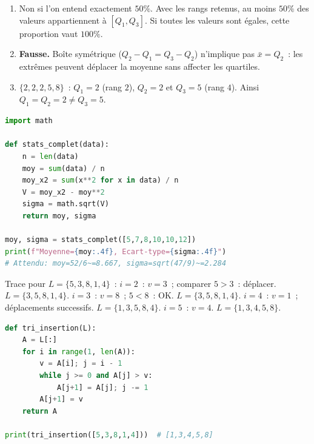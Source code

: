 
\begin{enumerate}
  \item Non si l'on entend exactement $50\%$. Avec les rangs retenus,
        au moins $50\%$ des valeurs appartiennent \`a $[Q_1,Q_3]$.
        Si toutes les valeurs sont \'egales, cette proportion vaut $100\%$.
  \item \textbf{Fausse.} Bo\^ite sym\'etrique ($Q_2-Q_1=Q_3-Q_2$) n'implique pas $\bar{x}=Q_2$~:
        les extr\^emes peuvent d\'eplacer la moyenne sans affecter les quartiles.
  \item $\{2,2,2,5,8\}$~: $Q_1=2$ (rang $2$), $Q_2=2$ et $Q_3=5$ (rang $4$).
        Ainsi $Q_1=Q_2=2\ne Q_3=5$.\checkmark
\end{enumerate}


\begin{lstlisting}[language=Python]
import math

def stats_complet(data):
    n = len(data)
    moy = sum(data) / n
    moy_x2 = sum(x**2 for x in data) / n
    V = moy_x2 - moy**2
    sigma = math.sqrt(V)
    return moy, sigma

moy, sigma = stats_complet([5,7,8,10,10,12])
print(f"Moyenne={moy:.4f}, Ecart-type={sigma:.4f}")
# Attendu: moy=52/6~=8.667, sigma=sqrt(47/9)~=2.284
\end{lstlisting}


Trace pour $L=\{5,3,8,1,4\}$~:
$i=2$~: $v=3$~; comparer $5>3$~: d\'eplacer. $L=\{3,5,8,1,4\}$.
$i=3$~: $v=8$~; $5<8$~: OK. $L=\{3,5,8,1,4\}$.
$i=4$~: $v=1$~; d\'eplacements successifs. $L=\{1,3,5,8,4\}$.
$i=5$~: $v=4$. $L=\{1,3,4,5,8\}$.\checkmark

\begin{lstlisting}[language=Python]
def tri_insertion(L):
    A = L[:]
    for i in range(1, len(A)):
        v = A[i]; j = i - 1
        while j >= 0 and A[j] > v:
            A[j+1] = A[j]; j -= 1
        A[j+1] = v
    return A

print(tri_insertion([5,3,8,1,4]))  # [1,3,4,5,8]
\end{lstlisting}


